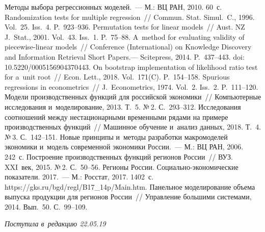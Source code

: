 \begin{multicols}{2}
{{\begin{thebibliography}{99}
   Методы выбора регрессионных моделей.~--- М.: ВЦ РАН, 2010. 
60~с.
   Randomization tests for multiple 
  regression~// Commun. 
Stat. Simul.~C., 1996. Vol.~25. Iss.~4. P.~923--936.
   Permutation tests for linear models~// 
  Aust. NZ J.~Stat., 2001. Vol.~43. Iss.~1.  
P.~75--88.
   A~method for 
evaluating validity of piecewise-linear models~// Conference (International) on Knowledge Discovery and 
Information Retrieval Short Papers.--- Scitepress, 2014. P.~437--443.
doi: 10.5220/0005156904370443.
   On bootstrap implementation of likelihood 
  ratio test for a~unit root~// Econ. Lett., 
2018. Vol.~171(C). P.~154--158.
   Spurious regressions in econometrics~// J.~Econometrics, 1974. Vol.~2. 
Iss.~2. P.~111--120.
   Модели производственных функций для российской экономики~// 
Компьютерные исследования и~моделирование, 2013. Т.~5. №\,2. С.~293--312.
   Исследования соотношений между нестационарными 
временными рядами на примере производственных функций~// Машинное обучение и~анализ данных, 
2018. Т.~4. №\,3. С.~142--151.
   Новые принципы и~методы 
разработки макромоделей экономики и~модель современной экономики России.~--- М.: ВЦ РАН, 2006. 
242~с.
   Построение производственных функций регионов России~// ВУЗ. XXI~век, 2015. 
№\,2. С.~50--56.
  Регионы России. Социально-экономические показатели. 
  2017.~--- М.: Росстат, 2017. 1402~с.
  {\sf https://gks.ru/bgd/regl/B17\_14p/Main.htm}.
   Панельное моделирование объема выпуска 
продукции для регионов России~// Управление большими системами, 2014. Вып.~50. С.~99--109.
\end{thebibliography}

 }
 }

\end{multicols}

\vspace*{-6pt}

\hfill{\small\textit{Поступила в~редакцию 22.05.19}}

